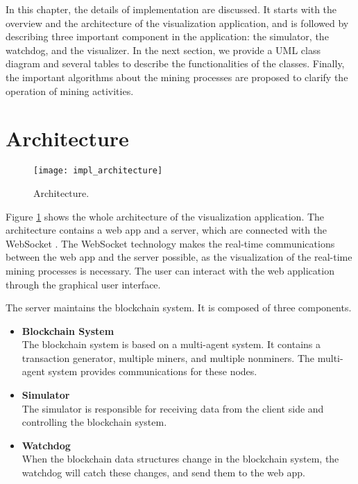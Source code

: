 In this chapter, the details of implementation are discussed. It starts with the overview and the architecture of the visualization application, and is followed by describing three important component in the application: the simulator, the watchdog, and the visualizer. In the next section, we provide a UML class diagram and several tables to describe the functionalities of the classes. Finally, the important algorithms about the mining processes are proposed to clarify the operation of mining activities.

\section{Architecture}

\begin{figure}[htb]
    \centering
    \texttt{[image: impl\_architecture]}
    \caption{Architecture.}
    \label{fig:architecture}
\end{figure}

Figure \ref{fig:architecture} shows the whole architecture of the visualization application. The architecture contains a web app and a server, which are connected with the WebSocket \cite{websocket}. The WebSocket technology makes the real-time communications between the web app and the server possible, as the visualization of the real-time mining processes is necessary. The user can interact with the web application through the graphical user interface.

The server maintains the blockchain system. It is composed of three components.

\begin{itemize}
    \item \textbf{Blockchain System} \\
        The blockchain system is based on a multi-agent system. It contains a transaction generator, multiple miners, and multiple nonminers. The multi-agent system provides communications for these nodes.
    \item \textbf{Simulator} \\
        The simulator is responsible for receiving data from the client side and controlling the blockchain system.
    \item \textbf{Watchdog} \\
        When the blockchain data structures change in the blockchain system, the watchdog will catch these changes, and send them to the web app. 
\end{itemize}

